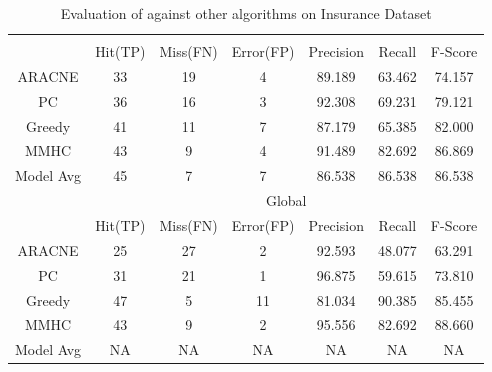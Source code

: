\begin{table}[th]
\begin{center}
\caption{\label{tab:insuranceComp}Evaluation of \lama{} against other algorithms on Insurance Dataset}
\small
\begin{tabular}{|c|c|c|c|c|c|c|}
\hline
 &\multicolumn{6}{c|}{\lama{}}\\
\cline{2-7}
 & Hit(TP) & Miss(FN) & Error(FP) & Precision & Recall & F-Score  \\
\hline
ARACNE & 33 & 19 & 4 & 89.189 & 63.462 & 74.157 \\
PC     & 36 & 16 & 3 & 92.308 & 69.231 & 79.121 \\
Greedy & 41 & 11 & 7 & 87.179 & 65.385 & 82.000 \\
MMHC   & 43 & 9  & 4 & 91.489 & 82.692 & 86.869 \\
\hline
Model Avg & 45 & 7 & 7 & 86.538 & 86.538 & 86.538 \\
\hline \hline
&\multicolumn{6}{c|}{Global}\\
\cline{2-7}
& Hit(TP) & Miss(FN) & Error(FP) & Precision & Recall & F-Score \\
\hline
ARACNE& 25 & 27 & 2 & 92.593 & 48.077 & 63.291 \\
PC    & 31 & 21 & 1 & 96.875 & 59.615 & 73.810 \\
Greedy& 47 & 5  & 11& 81.034 & 90.385 & 85.455 \\
MMHC  & 43 & 9  & 2 & 95.556 & 82.692 & 88.660 \\
\hline
Model Avg & NA & NA & NA & NA & NA & NA \\
\hline
\end{tabular}
\end{center}
\end{table}


